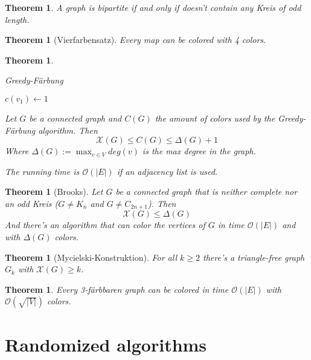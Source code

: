 \documentclass[12pt]{extarticle}
\theoremstyle{definition}
\theoremstyle{remark}
\theoremstyle{plain}
\newtheorem{theorem}[definition]{Theorem}
\theoremstyle{plain}
\theoremstyle{plain}
\newcommand{\BO}{\mathcal{O}}
\begin{document}
\begin{theorem}
    A graph is bipartite if and only if doesn't contain any Kreis of odd length.
\end{theorem}

\begin{theorem}[Vierfarbensatz]
    Every map can be colored with 4 colors.
\end{theorem}

\begin{theorem}
    \begin{algorithm}
        \caption{Greedy-Färbung}
        $c(v_1) \gets 1$\;
    \end{algorithm}

    Let $G$ be a connected graph and $C(G)$ the amount of colors used by the Greedy-Färbung algorithm.
    Then
    \[ \mathcal{X}(G) \le C(G) \le \Delta(G) + 1 \]
    Where $\Delta(G) := \max_{v \in V} deg(v)$ is the max degree in the graph.

    The running time is $\BO(|E|)$ if an adjacency list is used.
\end{theorem}

\begin{theorem}[Brooks]
    Let $G$ be a connected graph that is neither complete nor an odd Kreis ($G \ne K_n$ and $G \ne C_{2n+1}$).
    Then
    \[ \mathcal{X}(G) \le \Delta(G) \]
    And there's an algorithm that can color the vertices of $G$ in time $\BO(|E|)$ and with $\Delta(G)$ colors.
\end{theorem}

\begin{theorem}[Mycielski-Konstruktion]
    For all $k \ge 2$ there's a triangle-free graph $G_k$ with $\mathcal{X}(G) \ge k$.
\end{theorem}

\begin{theorem}
    Every 3-färbbaren graph can be colored in time $\BO(|E|)$ with $\BO(\sqrt{|V|})$ colors.
\end{theorem}

\section{Randomized algorithms}
\end{document}
